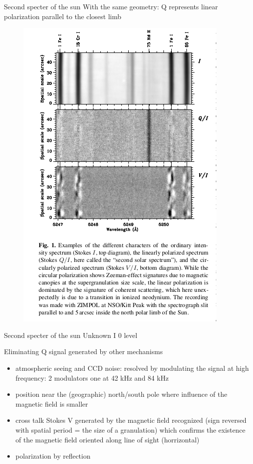 \documentclass{beamer}
\begin{document}
\begin{frame}{Second specter of the sun}
With the same geometry: Q represents linear polarization parallel to the closest limb
\begin{figure}[H]
 \centering
 \includegraphics[scale=0.5]{a3.png}
\end{figure}
\end{frame}

\begin{frame}{Second specter of the sun}
Unknown I 0 level

Eliminating Q signal generated by other mechanisms

\begin{itemize}

\item atmospheric seeing and CCD noise: resolved by modulating the signal at high frequency: 2 modulators one
at 42 kHz and 84 kHz

\item position near the (geographic) north/south pole where influence of the magnetic field is smaller

\item cross talk Stokes V generated by the magnetic field recognized (sign reversed with spatial period = the size of a granulation)
which confirms the existence of the magnetic field oriented along line of sight (horrizontal)

\item polarization by reflection
\end{itemize}
\end{frame}
\end{document}
